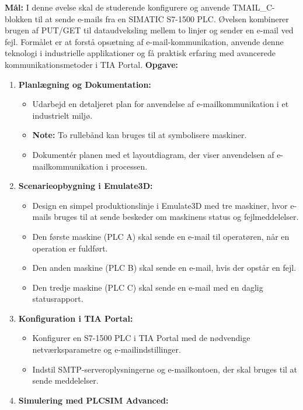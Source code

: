 \textbf{Mål:} I denne øvelse skal de studerende konfigurere og anvende TMAIL\_C-blokken til at sende e-mails fra en SIMATIC S7-1500 PLC. Øvelsen kombinerer brugen af PUT/GET til dataudveksling mellem to linjer og sender en e-mail ved fejl. Formålet er at forstå opsætning af e-mail-kommunikation, anvende denne teknologi i industrielle applikationer og få praktisk erfaring med avancerede kommunikationsmetoder i TIA Portal.
\newline\newline\noindent
\textbf{Opgave:}
\begin{enumerate}
	\item \textbf{Planlægning og Dokumentation:}
	\begin{itemize}
		\item Udarbejd en detaljeret plan for anvendelse af e-mailkommunikation i et industrielt miljø.
		\item \textbf{Note:} To rullebånd kan bruges til at symbolisere maskiner.
		\item Dokumentér planen med et layoutdiagram, der viser anvendelsen af e-mailkommunikation i processen.
	\end{itemize}
	\item \textbf{Scenarieopbygning i Emulate3D:}
	\begin{itemize}
		\item Design en simpel produktionslinje i Emulate3D med tre maskiner, hvor e-mails bruges til at sende beskeder om maskinens status og fejlmeddelelser.
		\item Den første maskine (PLC A) skal sende en e-mail til operatøren, når en operation er fuldført.
		\item Den anden maskine (PLC B) skal sende en e-mail, hvis der opstår en fejl.
		\item Den tredje maskine (PLC C) skal sende en e-mail med en daglig statusrapport.
	\end{itemize}
	\item \textbf{Konfiguration i TIA Portal:}
	\begin{itemize}
		\item Konfigurer en S7-1500 PLC i TIA Portal med de nødvendige netværksparametre og e-mailindstillinger.
		\item Indstil SMTP-serveroplysningerne og e-mailkontoen, der skal bruges til at sende meddelelser.
	\end{itemize}
	\item \textbf{Simulering med PLCSIM Advanced:}
	\begin{itemize}

\end{itemize}
\end{enumerate}
